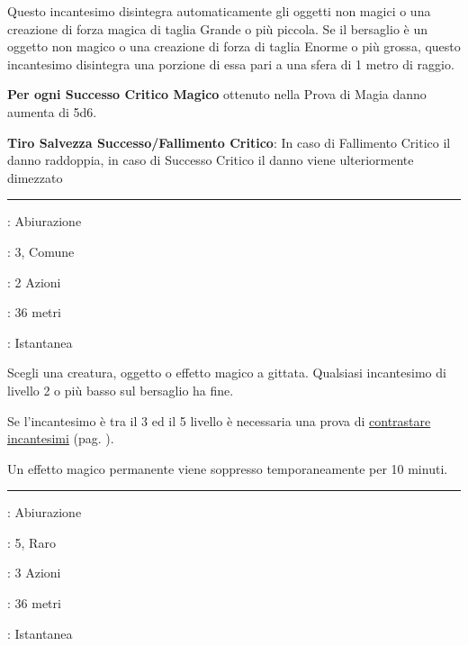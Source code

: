 \begin{multicols}{2}
Questo incantesimo disintegra automaticamente gli oggetti non magici o una creazione di forza magica di taglia Grande o più piccola. Se il bersaglio è un oggetto non magico o una creazione di forza di taglia Enorme o più grossa, questo incantesimo disintegra una porzione di essa pari a una sfera di 1 metro di raggio.

\textbf{Per ogni Successo Critico Magico} ottenuto nella Prova di Magia danno aumenta di 5d6.

\textbf{Tiro Salvezza Successo/Fallimento Critico}: In caso di Fallimento Critico il danno raddoppia, in caso di Successo Critico il danno viene ulteriormente dimezzato



\smallskip\noindent\rule{\linewidth}{2pt} \hypertarget{Dissolvi Magie}{}\smallskip{}\hypertarget{dissolvimagie}{}
\noindent
\begin{description}[noitemsep, topsep=0pt, parsep=0pt, partopsep=0pt, leftmargin=0cm, labelwidth=1.3cm]
	\item[\textbf{Lista}]: Abiurazione
	\item[\textbf{Livello}]: 3, Comune
	\item[\textbf{Lancio}]: 2 Azioni
	\item[\textbf{Gittata}]: 36 metri
	\item[\textbf{Durata}]: Istantanea
\end{description}

Scegli una creatura, oggetto o effetto magico a gittata. Qualsiasi incantesimo di livello 2 o più basso sul bersaglio ha fine.

Se l'incantesimo è tra il 3 ed il 5 livello è necessaria una prova di \hyperlink{contrastareincantesimi}{contrastare incantesimi} (pag. \pageref{contrastareincantesimi}).

Un effetto magico permanente viene soppresso temporaneamente per 10 minuti.

\smallskip\noindent\rule{\linewidth}{2pt} \hypertarget{Dissolvi Magie Avanzato}{}\smallskip{}\hypertarget{dissolvimagieavanzato}{}
\noindent
\begin{description}[noitemsep, topsep=0pt, parsep=0pt, partopsep=0pt, leftmargin=0cm, labelwidth=1.3cm]
	\item[\textbf{Lista}]: Abiurazione
	\item[\textbf{Livello}]: 5, Raro
	\item[\textbf{Lancio}]: 3 Azioni
	\item[\textbf{Gittata}]: 36 metri
	\item[\textbf{Durata}]: Istantanea
\end{description}


\end{multicols}

